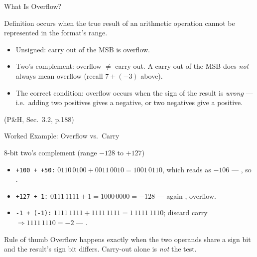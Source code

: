 \documentclass[aspectratio=169]{beamer}
\begin{document}
\begin{frame}{What Is Overflow?}
  \begin{block}{Definition}
     occurs when the true result of an arithmetic operation
    cannot be represented in the format's range.
  \end{block}
  \begin{itemize}
    \item Unsigned: carry out of the MSB is overflow.
    \item Two's complement: overflow $\neq$ carry out. A carry out of the MSB
      does \emph{not} always mean overflow (recall $7+(-3)$ above).
    \item The correct condition: overflow occurs when the sign of the result
      is \emph{wrong} --- i.e.\ adding two positives gives a negative, or two
      negatives give a positive.
  \end{itemize}
  (P\&H, Sec.~3.2, p.188) \cite{PattersonHennessy2017_computer_organization_design}
\end{frame}

\begin{frame}{Worked Example: Overflow vs.\ Carry}
  \begin{block}{8-bit two's complement (range $-128$ to $+127$)}
    \begin{itemize}
      \item \texttt{+100 + +50:} $0110\,0100 + 0011\,0010 = 1001\,0110$, which
        reads as $-106$ --- , so .
      \item \texttt{+127 + 1:} $0111\,1111 + 1 = 1000\,0000 = -128$ --- again
        , overflow.
      \item \texttt{-1 + (-1):} $1111\,1111 + 1111\,1111 = 1\,1111\,1110$;
        discard carry $\Rightarrow 1111\,1110 = -2$ --- .
    \end{itemize}
  \end{block}
  \begin{alertblock}{Rule of thumb}
    Overflow happens exactly when the two operands share a sign bit and the
    result's sign bit differs. Carry-out alone is \emph{not} the test.
  \end{alertblock}
\end{frame}
\end{document}
